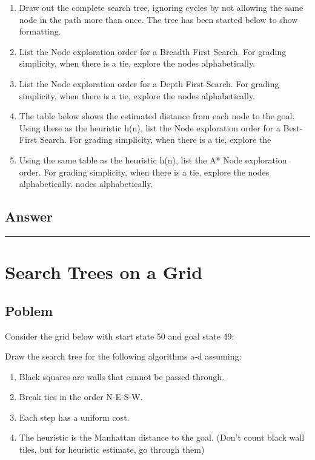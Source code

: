 \documentclass[11pt]{article}
\begin{document}
\begin{flushleft}
\begin{enumerate}
    \item Draw out the complete search tree, ignoring cycles by not allowing
        the same node in the path more than once. The tree has been started
        below to show formatting.
    \item List the Node exploration order for a Breadth First Search. For
        grading simplicity, when there is a tie, explore the nodes
        alphabetically.
    \item List the Node exploration order for a Depth First Search. For grading
        simplicity, when there is a tie, explore the nodes alphabetically.
    \item The table below shows the estimated distance from each node to the
        goal. Using these as the heuristic h(n), list the Node exploration
        order for a Best-First Search. For grading simplicity, when there is a
        tie, explore the
    \item Using the same table as the heuristic h(n), list the A* Node
        exploration order. For grading simplicity, when there is a tie, explore
        the nodes alphabetically. nodes alphabetically.
\end{enumerate}

\subsection*{Answer}

\hspace{1cm}
\hrule
\section*{Search Trees on a Grid}

\subsection*{Poblem}
Consider the grid below with start state 50 and goal state 49:

Draw the search tree for the following algorithms a-d assuming: 
\begin{enumerate}
    \item Black squares are walls that cannot be passed through. 
    \item Break ties in the order N-E-S-W.
    \item Each step has a uniform cost.
    \item The heuristic is the Manhattan distance to the goal. (Don’t count
        black wall tiles, but for heuristic estimate, go through them)
\end{enumerate}


\end{flushleft}
\end{document}
